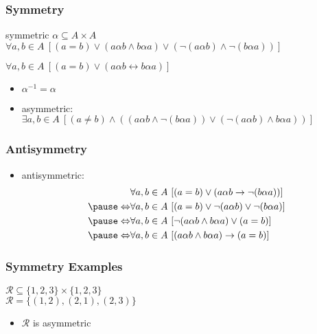 \documentclass[dvipsnames]{beamer}
\begin{document}
\begin{frame}
  \frametitle{Symmetry}

  \begin{block}{symmetric}
    $\alpha \subseteq A \times A$\\
    $\forall a,b \in A~[(a=b) \vee (a \alpha b \wedge b \alpha a)
                              \vee (\neg(a \alpha b) \wedge \neg(b \alpha a))]$

    \pause
    $\forall a,b \in A~[(a=b) \vee (a \alpha b \leftrightarrow b \alpha a)]$
  \end{block}

  \pause
  \begin{itemize}
    \item $\alpha^{-1} = \alpha$

    \pause
    \item asymmetric:\\
      $\exists a,b \in A~[(a \neq b) \wedge ((a \alpha b \wedge \neg(b \alpha a))
                                     \vee (\neg (a \alpha b) \wedge b \alpha a))]$
  \end{itemize}
\end{frame}

\begin{frame}
  \frametitle{Antisymmetry}

  \begin{itemize}
    \item antisymmetric:
    \begin{eqnarray*}
                      & \forall a,b \in A~
                    [(a=b) \vee (a \alpha b \rightarrow \neg(b \alpha a))]\\\pause
      \Leftrightarrow & \forall a,b \in A~
                    [(a=b) \vee \neg(a \alpha b) \vee \neg(b \alpha a)]\\\pause
      \Leftrightarrow & \forall a,b \in A~
                    [\neg(a \alpha b \wedge b \alpha a) \vee (a=b)]\\\pause
      \Leftrightarrow & \forall a,b \in A~
                    [(a \alpha b \wedge b \alpha a) \rightarrow (a=b)]
    \end{eqnarray*}
  \end{itemize}
\end{frame}

\begin{frame}
  \frametitle{Symmetry Examples}

  $\mathcal{R} \subseteq \{1,2,3\} \times \{1,2,3\}$\\
  $\mathcal{R} = \{(1,2), (2,1), (2,3)\}$

  \medskip
  \begin{itemize}
    \item $\mathcal{R}$ is asymmetric
  \end{itemize}
\end{frame}
\end{document}
